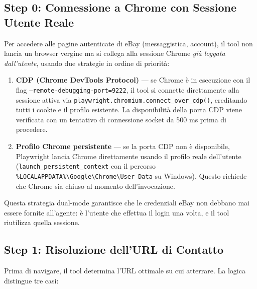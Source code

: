 \subsection{Step 0: Connessione a Chrome con Sessione Utente Reale}
\label{subsec:pw-contact-conn}

Per accedere alle pagine autenticate di eBay (messaggistica, account),
il tool non lancia un browser vergine ma si collega alla sessione
Chrome \emph{già loggata dall'utente}, usando due strategie in ordine
di priorità:

\begin{enumerate}
    \item \textbf{CDP (Chrome DevTools Protocol)} — se Chrome è in
        esecuzione con il flag \texttt{--remote-debugging-port=9222},
        il tool si connette direttamente alla sessione attiva via
        \texttt{playwright.chromium.connect\_over\_cdp()}, ereditando
        tutti i cookie e il profilo esistente. La disponibilità
        della porta CDP viene verificata con un tentativo di connessione
        socket da 500 ms prima di procedere.

    \item \textbf{Profilo Chrome persistente} — se la porta CDP non
        è disponibile, Playwright lancia Chrome direttamente usando
        il profilo reale dell'utente (\texttt{launch\_persistent\_context}
        con il percorso \texttt{\%LOCALAPPDATA\%\textbackslash{}Google\textbackslash{}Chrome\textbackslash{}User Data}
        su Windows). Questo richiede che Chrome sia chiuso al momento
        dell'invocazione.
\end{enumerate}

Questa strategia dual-mode garantisce che le credenziali eBay non
debbano mai essere fornite all'agente: è l'utente che effettua il login
una volta, e il tool riutilizza quella sessione.

\subsection{Step 1: Risoluzione dell'URL di Contatto}
\label{subsec:pw-contact-url}

Prima di navigare, il tool determina l'URL ottimale su cui atterrare.
La logica distingue tre casi:

